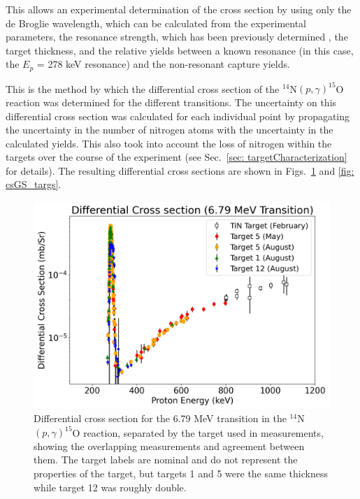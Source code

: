 \noindent This allows an experimental determination of the cross section by using only the de Broglie wavelength, which can be calculated from the experimental parameters, the resonance strength, which has been previously determined \cite{Imbriani2005, Daigle2016}, the target thickness, and the relative yields between a known resonance (in this case, the $E_{p}$ = 278 keV resonance) and the non-resonant capture yields. 


This is the method by which the differential cross section of the $^{14}$N$\left( p,\gamma \right) ^{15}$O reaction was determined for the different transitions. The uncertainty on this differential cross section was calculated for each individual point by propagating the uncertainty in the number of nitrogen atoms with the uncertainty in the calculated yields. This also took into account the loss of nitrogen within the targets over the course of the experiment (see Sec.\ \ref{sec: targetCharacterization} for details). The resulting differential cross sections are shown in Figs.\ \ref{fig: cs679_targs} and \ref{fig: csGS_targs}. 



\begin{figure}
		\includegraphics[width=1.0\linewidth]{figures/cs679_targs.png}
	\caption{Differential cross section for the 6.79 MeV transition in the $^{14}$N$\left( p,\gamma \right) ^{15}$O reaction, separated by the target used in measurements, showing the overlapping measurements and agreement between them. The target labels are nominal and do not represent the properties of the target, but targets 1 and 5 were the same thickness while target 12 was roughly double.}
	\label{fig: cs679_targs}
\end{figure}

